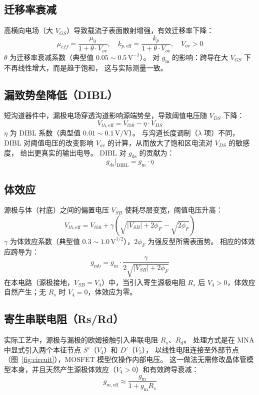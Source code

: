 \documentclass[12pt, a4paper]{article}
\newcommand{\gm}{g_{\mathrm{m}}}
\newcommand{\gds}{g_{\mathrm{ds}}}
\newcommand{\gmb}{g_{\mathrm{mb}}}
\begin{document}
\subsection{迁移率衰减}

高横向电场（大 $V_{GS}$）导致载流子表面散射增强，有效迁移率下降：
\[
  \mu_{eff} = \frac{\mu_0}{1 + \theta \cdot V_{ov}},\quad
  k_{p,\mathrm{eff}} = \frac{k_p}{1 + \theta \cdot V_{ov}},\quad V_{ov}>0
\]
$\theta$ 为迁移率衰减系数（典型值 $0.05\sim0.5\,\mathrm{V^{-1}}$）。
对 $\gm$ 的影响：跨导在大 $V_{GS}$ 下不再线性增大，而是趋于饱和，
这与实际测量一致。

\subsection{漏致势垒降低（DIBL）}

短沟道器件中，漏极电场穿透沟道影响源端势垒，导致阈值电压随 $V_{DS}$ 下降：
\[
  V_{th,\mathrm{eff}} = V_{th0} - \eta \cdot V_{DS}
\]
$\eta$ 为 DIBL 系数（典型值 $0.01\sim0.1\,\mathrm{V/V}$）。
与沟道长度调制（$\lambda$ 项）不同，DIBL 对阈值电压的改变影响
$V_{ov}$ 的计算，从而放大了饱和区电流对 $V_{DS}$ 的敏感度，
给出更真实的输出电导。
DIBL 对 $\gds$ 的贡献为：
\[
  \gds\big|_{\mathrm{DIBL}} = \gm \cdot \eta
\]

\subsection{体效应}

源极与体（衬底）之间的偏置电压 $V_{SB}$ 使耗尽层变宽，阈值电压升高：
\[
  V_{th,\mathrm{eff}} = V_{th0} + \gamma\left(\sqrt{|V_{SB}|+2\phi_F} - \sqrt{2\phi_F}\right)
\]
$\gamma$ 为体效应系数（典型值 $0.3\sim1.0\,\mathrm{V^{1/2}}$），$2\phi_F$ 为强反型所需表面势。
相应的体效应跨导为：
\[
  \gmb = \gm \cdot \frac{\gamma}{2\sqrt{|V_{SB}|+2\phi_F}}
\]
在本电路（源极接地，$V_{SB}=V_4$）中，当引入寄生源极电阻 $R_s$ 后
$V_4>0$，体效应自然产生；无 $R_s$ 时 $V_4=0$，体效应为零。

\subsection{寄生串联电阻（Rs/Rd）}

实际工艺中，源极与漏极的欧姆接触引入串联电阻 $R_s$、$R_d$。
处理方式是在 MNA 中显式引入两个本征节点 $S'$（$V_4$）和 $D'$（$V_5$），
以线性电阻连接至外部节点（图~\ref{fig:circuit}），MOSFET 模型仅操作内部电压。
这一做法无需修改晶体管模型本身，并且天然产生源极体效应（$V_4>0$）和有效跨导衰减：
\[
  g_{m,\mathrm{eff}} \approx \frac{\gm}{1 + \gm R_s}
\]
\end{document}
